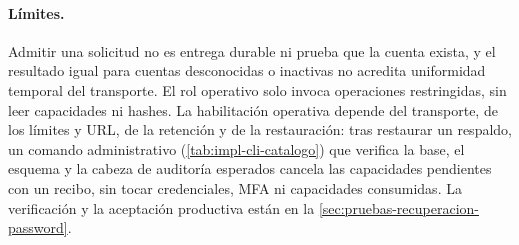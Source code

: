 \paragraph{Límites.} Admitir una solicitud no es entrega durable ni prueba que la cuenta exista, y el resultado igual para cuentas desconocidas o inactivas no acredita uniformidad temporal del transporte. El rol operativo solo invoca operaciones restringidas, sin leer capacidades ni hashes. La habilitación operativa depende del transporte, de los límites y URL, de la retención y de la restauración: tras restaurar un respaldo, un comando administrativo (\cref{tab:impl-cli-catalogo}) que verifica la base, el esquema y la cabeza de auditoría esperados cancela las capacidades pendientes con un recibo, sin tocar credenciales, MFA ni capacidades consumidas. La verificación y la aceptación productiva están en la \cref{sec:pruebas-recuperacion-password}.

